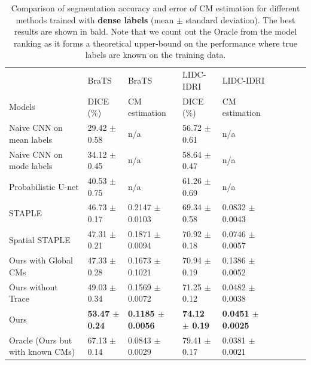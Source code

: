 \begin{table}[H]
	\center
	\scriptsize
	\begin{tabular}{@{}lllllllll}
		\hline
		 & BraTS & BraTS  & LIDC-IDRI  & LIDC-IDRI  \\
		Models & DICE (\%) & CM estimation & DICE (\%) & CM estimation \\
		  
		\hline	
		Naive CNN on mean labels & 29.42 $\pm$ 0.58  &  n/a & 56.72 $\pm$ 0.61  &  n/a  \\
		Naive CNN on mode labels & 34.12 $\pm$ 0.45  &  n/a & 58.64 $\pm$ 0.47  &  n/a  \\
		Probabilistic U-net \cite{kohl2018probabilistic}  & 40.53 $\pm$ 0.75   &  n/a  & 61.26 $\pm$ 0.69  &  n/a   \\
		STAPLE \cite{warfield2004simultaneous}& 46.73 $\pm$ 0.17  & 0.2147 $\pm$ 0.0103   & 69.34 $\pm$ 0.58  & 0.0832 $\pm$ 0.0043   \\ 
		Spatial STAPLE \cite{asman2012formulating} & 47.31 $\pm$ 0.21  & 0.1871 $\pm$ 0.0094   & 70.92 $\pm$ 0.18  &  0.0746 $\pm$ 0.0057   \\
		Ours with Global CMs &  47.33 $\pm $ 0.28  &  0.1673 $\pm $ 0.1021    & 70.94 $\pm $ 0.19  & 0.1386 $\pm $ 0.0052   \\
		Ours without Trace & 49.03 $\pm$ 0.34   & 0.1569 $\pm$ 0.0072   & 71.25 $\pm$ 0.12  & 0.0482 $\pm$ 0.0038    \\
		Ours & \textbf{53.47 $\pm $ 0.24}  & \textbf{0.1185 $\pm$ 0.0056 }  & \textbf{74.12 $\pm $ 0.19 } &  \textbf{0.0451 $\pm$ 0.0025     }\\
		Oracle (Ours but with known CMs)   & 67.13 $\pm$ 0.14  & 0.0843 $\pm$ 0.0029  & 79.41 $\pm$ 0.17  & 0.0381 $\pm$ 0.0021    \\ 
		\hline
	\end{tabular}%
	\vspace{1mm}
    \caption{\footnotesize Comparison of segmentation accuracy and error of CM estimation for different methods trained with \textbf{dense labels} (mean $\pm$ standard deviation). The best results are shown in bald. Note that we count out the Oracle from the model ranking as it forms a theoretical upper-bound on the performance where true labels are known on the training data.}
\label{denselabebrats}
\end{table}
\vspace{-5mm}
